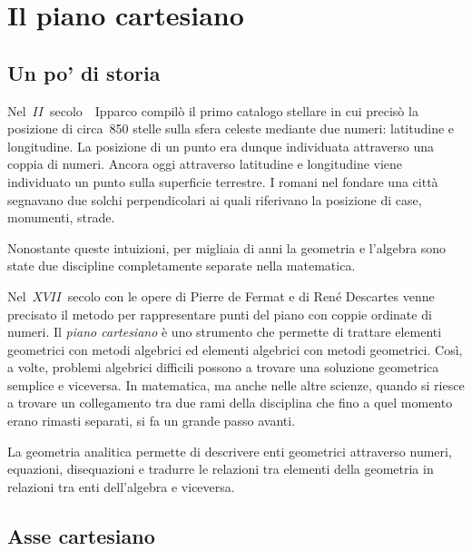 


\chapter{Il piano cartesiano}

\section{Un po' di storia}
\label{sec:01_storia}

Nel~\(II\)~secolo~\aC\ Ipparco compilò il primo catalogo stellare in cui 
precisò la posizione di circa~850 stelle sulla sfera celeste mediante due 
numeri: latitudine e longitudine. La posizione di un punto era dunque 
individuata attraverso una coppia di numeri.
Ancora oggi attraverso latitudine e longitudine viene individuato un punto 
sulla superficie terrestre.
I romani nel fondare una città segnavano due solchi perpendicolari ai quali 
riferivano la posizione di case, monumenti, strade.

Nonostante queste intuizioni, per migliaia di anni la geometria e l'algebra 
sono state due discipline completamente separate nella matematica.

Nel~\(XVII\)~secolo con le opere di Pierre de Fermat e di René Descartes 
venne precisato il metodo per rappresentare punti del piano con coppie 
ordinate di numeri. 
Il \emph{piano cartesiano} è uno strumento che permette di trattare elementi 
geometrici con metodi algebrici ed elementi algebrici con metodi geometrici.
Così, a volte,  problemi algebrici difficili possono a trovare una soluzione 
geometrica semplice e viceversa.
In matematica, ma anche nelle altre scienze, quando si riesce a trovare un 
collegamento tra due rami della disciplina che fino a quel momento erano
rimasti separati, si fa un grande passo avanti.

La geometria analitica permette di descrivere enti geometrici attraverso 
numeri, equazioni, disequazioni e tradurre le relazioni tra elementi della 
geometria in relazioni tra enti dell'algebra e viceversa.

\section{Asse cartesiano}
\label{sec:02_asse}

